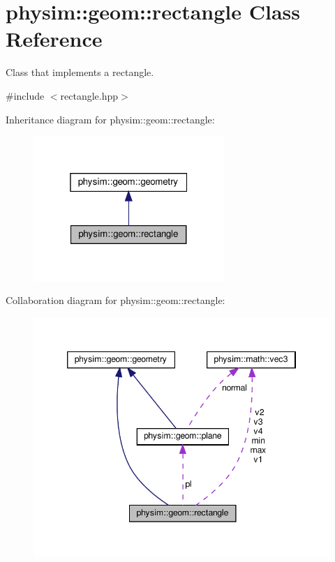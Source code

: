 \hypertarget{classphysim_1_1geom_1_1rectangle}{}\section{physim\+:\+:geom\+:\+:rectangle Class Reference}
\label{classphysim_1_1geom_1_1rectangle}


Class that implements a rectangle.  




{\ttfamily \#include $<$rectangle.\+hpp$>$}



Inheritance diagram for physim\+:\+:geom\+:\+:rectangle\+:\nopagebreak
\begin{figure}[H]
\begin{center}
\leavevmode
\includegraphics[width=205pt]{classphysim_1_1geom_1_1rectangle__inherit__graph}
\end{center}
\end{figure}


Collaboration diagram for physim\+:\+:geom\+:\+:rectangle\+:\nopagebreak
\begin{figure}[H]
\begin{center}
\leavevmode
\includegraphics[width=346pt]{classphysim_1_1geom_1_1rectangle__coll__graph}
\end{center}
\end{figure}
